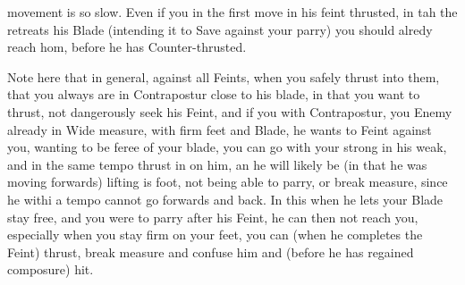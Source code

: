 \newpage


\newpage


movement is so slow. Even if you in the first move in his feint
thrusted, in tah the retreats his Blade (intending it to Save against
your parry) you should alredy reach hom, before he has
Counter-thrusted.


Note here that in general, against all Feints, when you safely thrust
into them, that you always are in Contrapostur close to his blade, in
that you want to thrust, not dangerously seek his Feint, and if you
with Contrapostur, you Enemy already in Wide measure, with firm feet
and Blade, he wants to Feint against you, wanting to be feree of your
blade, you can go with your strong in his weak, and in the same tempo
thrust in on him, an he will likely be (in that he was moving forwards)
lifting is foot, not being able to parry, or break measure, since he
withi a tempo cannot go forwards and back. In this when he lets your
Blade stay free, and you were to parry after his Feint, he can then
not reach you, especially when you stay firm on your feet, you can
(when he completes the Feint) thrust, break measure and confuse him
and (before he has regained composure) hit.


